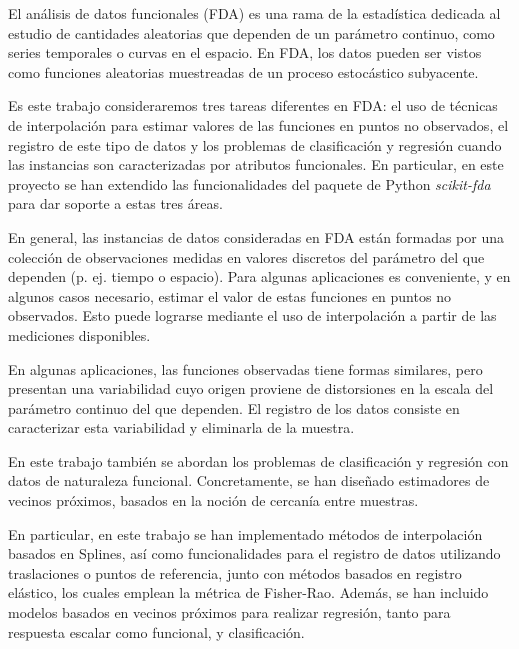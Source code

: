 El análisis de datos funcionales (FDA) es una rama de la estadística dedicada
al estudio de cantidades aleatorias que dependen de un parámetro continuo,
como series temporales o curvas en el espacio. En FDA, los datos pueden ser
vistos como funciones aleatorias muestreadas de un proceso
estocástico subyacente.

Es este trabajo consideraremos tres tareas diferentes en FDA:
el uso de técnicas de interpolación para estimar valores de las funciones
en puntos no observados,
el registro de este tipo de datos
y los problemas de clasificación y regresión cuando las instancias
son caracterizadas por atributos funcionales.
En particular, en este proyecto se han extendido las funcionalidades del
paquete de Python \textit{scikit-fda} para dar soporte a estas tres áreas.

En general, las instancias de datos consideradas en FDA están formadas por una
colección de observaciones medidas en valores discretos del parámetro del
que dependen (p. ej. tiempo o espacio).
Para algunas aplicaciones es conveniente, y en algunos casos necesario,
estimar el valor de estas funciones en puntos no observados.
Esto puede lograrse mediante el uso de interpolación a partir de las
mediciones disponibles.

En algunas aplicaciones, las funciones observadas tiene formas similares,
pero presentan una variabilidad cuyo origen proviene de
distorsiones en la escala del parámetro continuo del que
dependen. El registro de los datos consiste en caracterizar esta variabilidad
y eliminarla de la muestra.


En este trabajo también se abordan los problemas de clasificación y regresión
con datos de naturaleza funcional. Concretamente, se han diseñado
estimadores de vecinos próximos, basados en la noción de cercanía entre muestras.

En particular, en este trabajo se han implementado métodos de
interpolación basados en Splines, así como funcionalidades para el
registro de datos utilizando traslaciones o puntos de referencia,
junto con métodos basados en registro elástico, los cuales emplean la métrica
de Fisher-Rao. Además, se han incluido modelos basados en vecinos próximos
para realizar regresión, tanto para respuesta escalar como funcional, y
clasificación.
